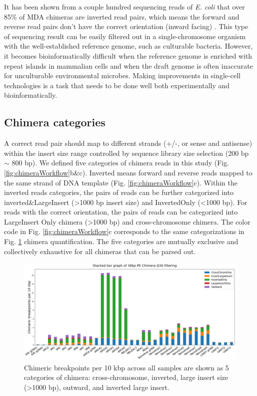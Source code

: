 It has been shown from a couple hundred sequencing reads of \textit{E. coli} that over 85\% of MDA chimeras are inverted read pairs, which means the forward and reverse read pairs don't have the correct orientation (inward facing) \cite{Lasken:2007db}. This type of sequencing result can be easily filtered out in a single-chromosome organism with the well-established reference genome, such as culturable bacteria. However, it becomes bioinformatically difficult when the reference genome is enriched with repeat islands in mammalian cells and when the draft genome is often inaccurate for unculturable environmental microbes. Making improvements in single-cell technologies is a task that needs to be done well both experimentally and bioinformatically. 

\subsection{Chimera categories}
A correct read pair should map to different strands (+/-, or sense and antisense) within the insert size range controlled by sequence library size selection (200 bp $\sim$ 800 bp). We defined five categories of chimera reads in this study (Fig. \ref{fig:chimeraWorkflow}b&c). Inverted means forward and reverse reads mapped to the same strand of DNA template (Fig. \ref{fig:chimeraWorkflow}c).  Within the inverted reads categories, the pairs of reads can be further categorized into inverted\&LargeInsert (>1000 bp insert size) and InvertedOnly (<1000 bp). For reads with the correct orientation, the pairs of reads can be categorized into LargeInsert Only chimera (>1000 bp) and cross-chromosome chimera. The color code in Fig. \ref{fig:chimeraWorkflow}c corresponds to the same categorizations in Fig. \ref{fig:chimera5Categories} chimera quantification. The five categories are mutually exclusive and collectively exhaustive for all chimeras that can be parsed out. 

\begin{figure}
\centering
\includegraphics[keepaspectratio,width=1\textwidth]{./figures/20170727_ChimeraSubcategories_IScorrected_PE_30bp_Q30}
\caption[Chimeric breakpoints per 10 kbp]{Chimeric breakpoints per 10 kbp across all samples are shown as 5 categories of chimera: cross-chromosome, inverted, large insert size (>1000 bp), outward, and inverted large insert.}
\label{fig:chimera5Categories}
\end{figure}

